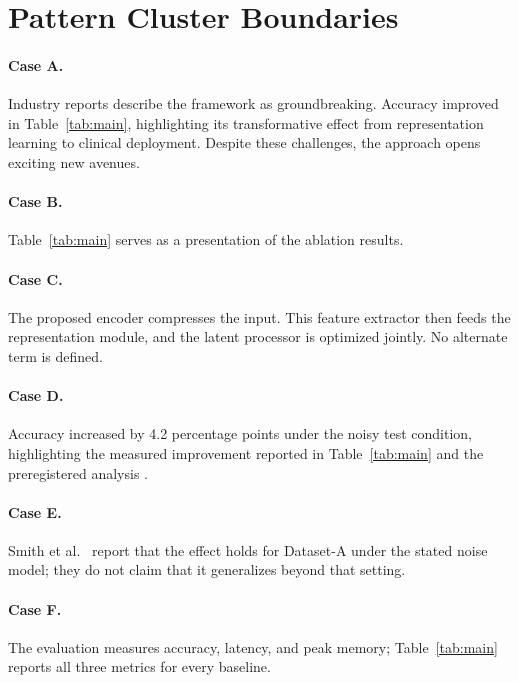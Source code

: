 \section{Pattern Cluster Boundaries}\label{sec:pattern-clusters}

\paragraph{Case A.}
Industry reports describe the framework as groundbreaking. Accuracy improved in
Table~\ref{tab:main}, highlighting its transformative effect from representation learning to
clinical deployment. Despite these challenges, the approach opens exciting new avenues.

\paragraph{Case B.}
Table~\ref{tab:main} serves as a presentation of the ablation results.

\paragraph{Case C.}
The proposed encoder compresses the input. This feature extractor then feeds the representation
module, and the latent processor is optimized jointly. No alternate term is defined.

\paragraph{Case D.}
Accuracy increased by 4.2 percentage points under the noisy test condition, highlighting the
measured improvement reported in Table~\ref{tab:main} and the preregistered analysis
\cite{smith2024}.

\paragraph{Case E.}
Smith et al.~\cite{smith2024} report that the effect holds for Dataset-A under the stated noise
model; they do not claim that it generalizes beyond that setting.

\paragraph{Case F.}
The evaluation measures accuracy, latency, and peak memory; Table~\ref{tab:main} reports all three
metrics for every baseline.

